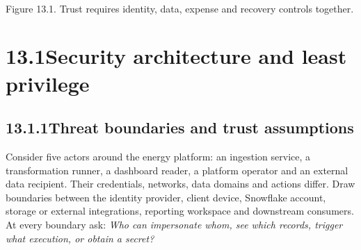 \documentclass[11pt,twoside]{article}
\newcommand{\topic}[2]{\subsection*{#1\quad #2}}
\begin{document}
\begin{center}\\{\fontsize{8}{9}\selectfont\color{inkgray}Figure 13.1. Trust requires identity, data, expense and recovery controls together.}\end{center}
\newpage
\section*{13.1\quad Security architecture and least privilege}
\topic{13.1.1}{Threat boundaries and trust assumptions}
Consider five actors around the energy platform: an ingestion service, a transformation runner, a dashboard reader, a platform operator and an external data recipient. Their credentials, networks, data domains and actions differ. Draw boundaries between the identity provider, client device, Snowflake account, storage or external integrations, reporting workspace and downstream consumers. At every boundary ask: \emph{Who can impersonate whom, see which records, trigger what execution, or obtain a secret?}
\end{document}
